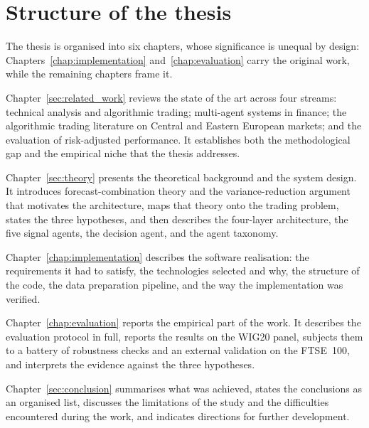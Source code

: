 \section{Structure of the thesis}\label{sec:structure}

The thesis is organised into six chapters, whose significance is unequal by design: Chapters~\ref{chap:implementation} and~\ref{chap:evaluation} carry the original work, while the remaining chapters frame it.

Chapter~\ref{sec:related_work} reviews the state of the art across four streams: technical analysis and algorithmic trading; multi-agent systems in finance; the algorithmic trading literature on Central and Eastern European markets; and the evaluation of risk-adjusted performance. It establishes both the methodological gap and the empirical niche that the thesis addresses.

Chapter~\ref{sec:theory} presents the theoretical background and the system design. It introduces forecast-combination theory and the variance-reduction argument that motivates the architecture, maps that theory onto the trading problem, states the three hypotheses, and then describes the four-layer architecture, the five signal agents, the decision agent, and the agent taxonomy.

Chapter~\ref{chap:implementation} describes the software realisation: the requirements it had to satisfy, the technologies selected and why, the structure of the code, the data preparation pipeline, and the way the implementation was verified.

Chapter~\ref{chap:evaluation} reports the empirical part of the work. It describes the evaluation protocol in full, reports the results on the WIG20 panel, subjects them to a battery of robustness checks and an external validation on the FTSE~100, and interprets the evidence against the three hypotheses.

Chapter~\ref{sec:conclusion} summarises what was achieved, states the conclusions as an organised list, discusses the limitations of the study and the difficulties encountered during the work, and indicates directions for further development.
